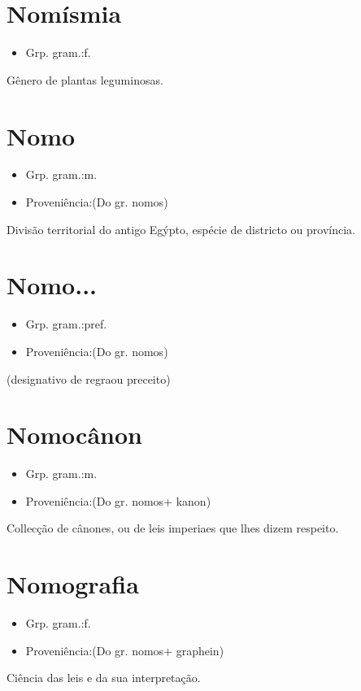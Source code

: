 \section{Nomísmia}
\begin{itemize}
\item {Grp. gram.:f.}
\end{itemize}
Gênero de plantas leguminosas.
\section{Nomo}
\begin{itemize}
\item {Grp. gram.:m.}
\end{itemize}
\begin{itemize}
\item {Proveniência:(Do gr. \textunderscore nomos\textunderscore )}
\end{itemize}
Divisão territorial do antigo Egýpto, espécie de districto ou província.
\section{Nomo...}
\begin{itemize}
\item {Grp. gram.:pref.}
\end{itemize}
\begin{itemize}
\item {Proveniência:(Do gr. \textunderscore nomos\textunderscore )}
\end{itemize}
(designativo de \textunderscore regra\textunderscore  ou \textunderscore preceito\textunderscore )
\section{Nomocânon}
\begin{itemize}
\item {Grp. gram.:m.}
\end{itemize}
\begin{itemize}
\item {Proveniência:(Do gr. \textunderscore nomos\textunderscore  + \textunderscore kanon\textunderscore )}
\end{itemize}
Collecção de cânones, ou de leis imperiaes que lhes dizem respeito.
\section{Nomografia}
\begin{itemize}
\item {Grp. gram.:f.}
\end{itemize}
\begin{itemize}
\item {Proveniência:(Do gr. \textunderscore nomos\textunderscore  + \textunderscore graphein\textunderscore )}
\end{itemize}
Ciência das leis e da sua interpretação.
